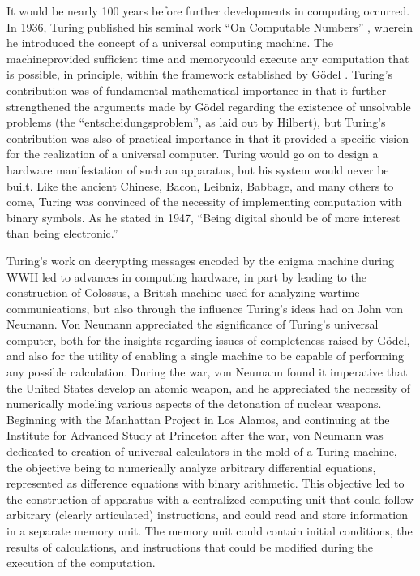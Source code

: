 \documentclass[twocolumn]{article}
\begin{document}
It would be nearly 100 years before further developments in computing occurred. In 1936, Turing published his seminal work ``On Computable Numbers'' \cite{tu1936}, wherein he introduced the concept of a universal computing machine. The machine\textemdash provided sufficient time and memory\textemdash could execute any computation that is possible, in principle, within the framework established by G\"{o}del \cite{}. Turing's contribution was of fundamental mathematical importance in that it further strengthened the arguments made by G\"{o}del regarding the existence of unsolvable problems (the ``entscheidungsproblem'', as laid out by Hilbert), but Turing's contribution was also of practical importance in that it provided a specific vision for the realization of a universal computer. Turing would go on to design a hardware manifestation of such an apparatus, but his system would never be built. Like the ancient Chinese, Bacon, Leibniz, Babbage, and many others to come, Turing was convinced of the necessity of implementing computation with binary symbols. As he stated in 1947, ``Being digital should be of more interest than being electronic.'' \cite{tu1947} 

Turing's work on decrypting messages encoded by the enigma machine during WWII led to advances in computing hardware, in part by leading to the construction of Colossus, a British machine used for analyzing wartime communications, but also through the influence Turing's ideas had on John von Neumann. Von Neumann appreciated the significance of Turing's universal computer, both for the insights regarding issues of completeness raised by G\"{o}del, and also for the utility of enabling a single machine to be capable of performing any possible calculation. During the war, von Neumann found it imperative that the United States develop an atomic weapon, and he appreciated the necessity of numerically modeling various aspects of the detonation of nuclear weapons. Beginning with the Manhattan Project in Los Alamos, and continuing at the Institute for Advanced Study at Princeton after the war, von Neumann was dedicated to creation of universal calculators in the mold of a Turing machine, the objective being to numerically analyze arbitrary differential equations, represented as difference equations with binary arithmetic. This objective led to the construction of apparatus with a centralized computing unit that could follow arbitrary (clearly articulated) instructions, and could read and store information in a separate memory unit. The memory unit could contain initial conditions, the results of calculations, and instructions that could be modified during the execution of the computation. 
\end{document}
